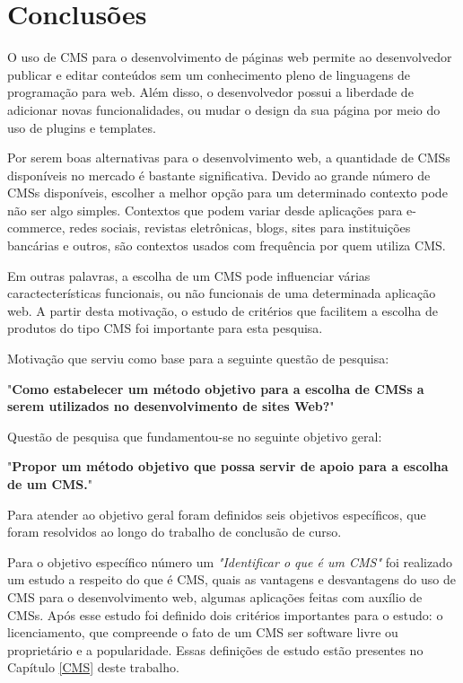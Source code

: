 \chapter[Conclusões]{Conclusões}
\label{final}


O uso de CMS para o desenvolvimento de páginas web permite ao desenvolvedor publicar e editar conteúdos sem um conhecimento pleno de linguagens de programação para web. Além disso, o desenvolvedor possui a liberdade de adicionar novas funcionalidades, ou mudar o design da sua página por meio do uso de plugins e templates. 

Por serem boas alternativas para o desenvolvimento web, a quantidade de CMSs disponíveis no mercado é bastante significativa. Devido ao grande número de CMSs disponíveis, escolher a melhor opção para um determinado contexto pode não ser algo simples. Contextos que podem variar desde aplicações para e-commerce, redes sociais, revistas eletrônicas, blogs, sites para instituições bancárias e outros, são contextos usados com frequência por quem utiliza CMS. 

Em outras palavras, a escolha de um CMS pode influenciar várias caractecterísticas funcionais, ou não funcionais de uma determinada aplicação web. A partir desta motivação, o estudo de critérios que facilitem a escolha de produtos do tipo CMS foi importante para esta pesquisa. 

Motivação que serviu como base para a seguinte questão de pesquisa: 

"\textbf{{Como estabelecer um método objetivo para a escolha de CMSs a serem utilizados no desenvolvimento de sites Web?}}"
  
Questão de pesquisa que fundamentou-se no seguinte objetivo geral:

"\textbf{Propor um método objetivo que possa servir de apoio para a escolha de um CMS.}"

Para atender ao objetivo geral foram definidos seis objetivos específicos, que foram resolvidos ao longo do trabalho de conclusão de curso.

Para o objetivo específico número um \textit{"Identificar o que é um CMS"} foi realizado um estudo a respeito do que é CMS, quais as vantagens e desvantagens do uso de CMS para o desenvolvimento web, algumas aplicações feitas com auxílio de CMSs. Após esse estudo foi definido dois critérios importantes para o estudo: o licenciamento, que compreende o fato de um CMS ser software livre ou proprietário e a popularidade. Essas definições de estudo estão presentes no Capítulo \ref{CMS} deste trabalho.

